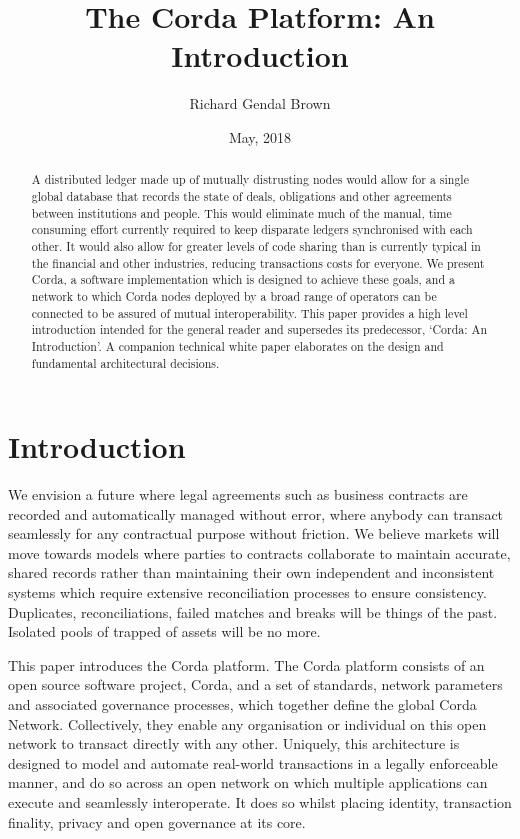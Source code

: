 \documentclass{article}
\author{Richard Gendal Brown}
\date{May, 2018}
\title{The Corda Platform: An Introduction}
\begin{document}
\maketitle 

\begin{abstract}

A distributed ledger made up of mutually distrusting nodes would allow for a single global database that records the state of deals, obligations and other agreements between institutions and people. This would eliminate much of the manual, time consuming effort currently required to keep disparate ledgers synchronised with each other. It would also allow for greater levels of code sharing than is currently typical in the financial and other industries, reducing transactions costs for everyone. We present Corda, a software implementation which is designed to achieve these goals, and a network to which Corda nodes deployed by a broad range of operators can be connected to be assured of mutual interoperability. This paper provides a high level introduction intended for the general reader and supersedes its predecessor, `Corda: An Introduction'\cite{CordaIntro}. A companion technical white paper\cite{CordaTech} elaborates on the design and fundamental architectural decisions.
\end{abstract}
\newpage
\tableofcontents
\newpage
\section{Introduction}
We envision a future where legal agreements such as business contracts are recorded and automatically managed without error, where anybody can transact seamlessly for any contractual purpose without friction. We believe markets will move towards models where parties to contracts collaborate to maintain accurate, shared records rather than maintaining their own independent and inconsistent systems which require extensive reconciliation processes to ensure consistency. Duplicates, reconciliations, failed matches and breaks will be things of the past. Isolated pools of trapped of assets will be no more.

This paper introduces the Corda platform. The Corda platform consists of an open source software project, Corda, and a set of standards, network parameters and associated governance processes, which together define the global Corda Network. Collectively, they enable any organisation or individual on this open network to transact directly with any other. Uniquely, this architecture is designed to model and automate real-world transactions in a legally enforceable manner, and do so across an open network on which multiple applications can execute and seamlessly interoperate. It does so whilst placing identity, transaction finality, privacy and open governance at its core.
\end{document}
